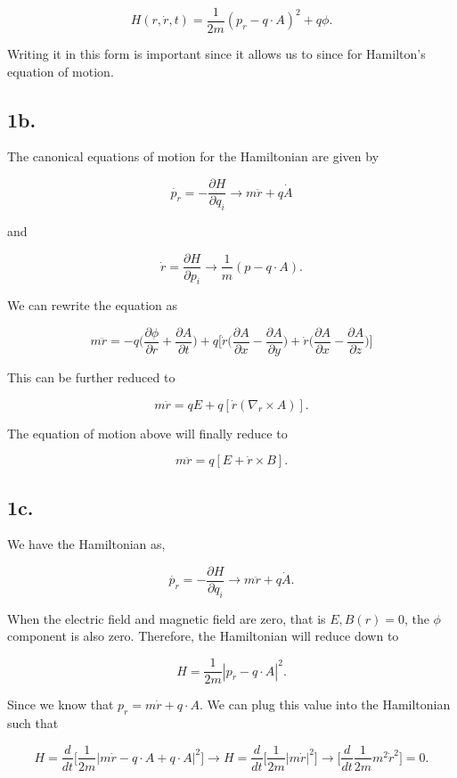 \documentclass[12pt]{article}
\begin{document}
$$
H(r, \dot{r}, t) = \frac{1}{2m}(p_{r} - q \cdot A)^{2} + q\phi.
$$

Writing it in this form is important since it allows us to since for Hamilton's equation of motion.

\subsection*{1b.}

The canonical equations of motion for the Hamiltonian are given by

$$
\dot{p_{r}} = -\frac{\partial H}{\partial q_{i}} \rightarrow m\ddot{r} + q\dot{A}
$$

and

$$
\dot{r} = \frac{\partial H}{\partial p_{i}} \rightarrow \frac{1}{m}(p - q \cdot A).
$$

We can rewrite the equation as

$$
m\ddot{r} = -q\Big(\frac{\partial \phi}{\partial r} +\frac{\partial A}{\partial t}\Big) + q \Big[\dot{r}\Big(\frac{\partial A}{\partial x} - \frac{\partial A}{\partial y}\Big) + \dot{r}(\frac{\partial A}{\partial x} - \frac{\partial A}{\partial z}\Big)\Big]
$$

This can be further reduced to 

$$
m\ddot{r} = qE + q[\dot{r}(\nabla_{r} \times A)].
$$

The equation of motion above will finally reduce to 

$$
m\ddot{r} = q[E + \dot{r} \times B].
$$

\subsection*{1c.}

We have the Hamiltonian as,

$$
\dot{p_{r}} = -\frac{\partial H}{\partial q_{i}} \rightarrow m\ddot{r} + q\dot{A}.
$$

When the electric field and magnetic field are zero, that is $E, B(r) = 0$, the $\phi$ component is also zero. Therefore, the Hamiltonian will reduce down to 

$$
H = \frac{1}{2m}|p_{r} - q \cdot A|^{2}.
$$

Since we know that $p_{r} = m\dot{r} + q \cdot A$. We can plug this value into the Hamiltonian such that

$$
H = \frac{d}{dt} \Big[\frac{1}{2m}|m\dot{r}- q \cdot A + q \cdot A |^{2}\Big] \rightarrow H = \frac{d}{dt} \Big[\frac{1}{2m}|m\dot{r} |^{2}\Big] \rightarrow \Big[\frac{d}{dt} \frac{1}{2m} m^{2}\dot{r}^{2}\Big] = 0.
$$
\end{document}
